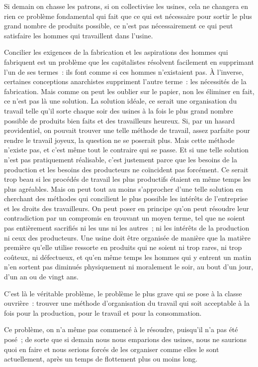 \documentclass[french,twoside]{book} %
\begin{document}
Si demain on chasse les patrons, si on collectivise les usines, cela ne changera en rien ce problème fondamental qui fait que ce qui est nécessaire pour sortir le plus grand nombre de produits possible, ce n'est pas nécessairement ce qui peut satisfaire les hommes qui travaillent dans l'usine.\par
Concilier les exigences de la fabrication et les aspirations des hommes qui fabriquent est un problème que les capitalistes résolvent facilement en supprimant l'un de ses termes : ils font comme si ces hommes n'existaient pas. À l'inverse, certaines conceptions anarchistes suppriment l'autre terme : les nécessités de la fabrication. Mais comme on peut les oublier sur le papier, non les éliminer en fait, ce n'est pas là une solution. La solution idéale, ce serait une organisation du travail telle qu'il sorte chaque soir des usines à la fois le plus grand nombre possible de produits bien faits et des travailleurs heureux. Si, par un hasard providentiel, on pouvait trouver une telle méthode de travail, assez parfaite pour rendre le travail joyeux, la question ne se poserait plus. Mais cette méthode n'existe pas, et c'est même tout le contraire qui se passe. Et si une telle solution n'est pas pratiquement réalisable, c'est justement parce que les besoins de la production et les besoins des producteurs ne coïncident pas forcément. Ce serait trop beau si les procédés de travail les plus productifs étaient en même temps les plus agréables. Mais on peut tout au moins s'approcher d'une telle solution en cherchant des méthodes qui concilient le plus possible les intérêts de l'entreprise et les droits des travailleurs. On peut poser en principe qu'on peut résoudre leur contradiction par un compromis en trouvant un moyen terme, tel que ne soient pas entièrement sacrifiés ni les uns ni les autres ; ni les intérêts de la production ni ceux des producteurs. Une usine doit être organisée de manière que la matière première qu'elle utilise ressorte en produits qui ne soient ni trop rares, ni trop coûteux, ni défectueux, et qu'en même temps les hommes qui y entrent un matin n'en sortent pas diminués physiquement ni moralement le soir, au bout d'un jour, d'un an ou de vingt ans.\par
C'est là le véritable problème, le problème le plus grave qui se pose à la classe ouvrière : trouver une méthode d'organisation du travail qui soit acceptable à la fois pour la production, pour le travail et pour la consommation.\par
Ce problème, on n'a même pas commencé à le résoudre, puisqu'il n'a pas été posé ; de sorte que si demain nous nous emparions des usines, nous ne saurions quoi en faire et nous serions forcés de les organiser comme elles le sont actuellement, après un temps de flottement plus ou moins long.\par
\end{document}
